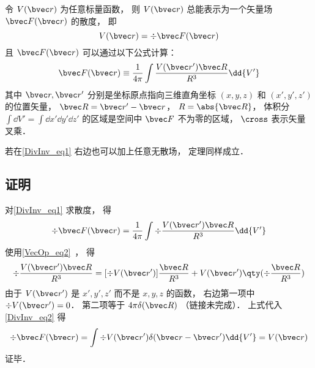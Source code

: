 

\begin{theorem}{}
令 $V(\bvec r)$ 为任意标量函数， 则 $V(\bvec r)$ 总能表示为一个矢量场 $\bvec F(\bvec r)$ 的散度， 即
\begin{equation}
V(\bvec r) = \div \bvec F(\bvec r)
\end{equation}
且 $\bvec F(\bvec r)$ 可以通过以下公式计算：
\begin{equation}\label{DivInv_eq1}
\bvec F(\bvec r) \equiv \frac{1}{4\pi}\int \frac{V(\bvec r') \bvec R}{R^3} \dd{V'}
\end{equation}
其中 $\bvec r, \bvec r'$ 分别是坐标原点指向三维直角坐标 $(x, y, z)$ 和 $(x', y', z')$ 的位置矢量， $\bvec R = \bvec r' - \bvec r$， $R = \abs{\bvec R}$， 体积分 $\int\dd{V'} = \int\dd{x'}\dd{y'}\dd{z'}$ 的区域是空间中 $\bvec F$ 不为零的区域， $\cross$ 表示矢量叉乘．

若在\autoref{DivInv_eq1} 右边也可以加上任意无散场， 定理同样成立．
\end{theorem}

\subsection{证明}
对\autoref{DivInv_eq1} 求散度， 得
\begin{equation}\label{DivInv_eq2}
\div \bvec F(\bvec r) = \frac{1}{4\pi}\int \div \frac{V(\bvec r') \bvec R}{R^3} \dd{V'}
\end{equation}
使用\autoref{VecOp_eq2}~， 得
\begin{equation}
\div \frac{V(\bvec r') \bvec R}{R^3} = [\div V(\bvec r')] \frac{ \bvec R}{R^3} + V(\bvec r') \qty(\div \frac{\bvec R}{R^3})
\end{equation}
由于 $V(\bvec r')$ 是 $x', y', z'$ 而不是 $x, y, z$ 的函数， 右边第一项中 $\div V(\bvec r') = 0$． 第二项等于 $4\pi \delta(\bvec R)$ （链接未完成）． 上式代入\autoref{DivInv_eq2} 得
\begin{equation}
\div \bvec F(\bvec r) = \int \div V(\bvec r') \delta(\bvec r - \bvec r') \dd{V'} = V(\bvec r)
\end{equation}
证毕．
